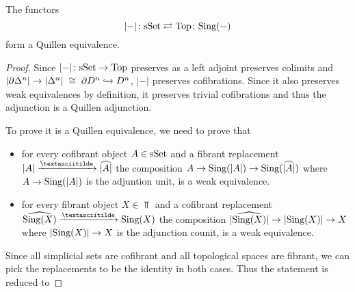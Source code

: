 \begin{prop}
    The functors
    \begin{equation*}
        \lvert-\rvert\colon\text{sSet}\rightleftarrows\text{Top}\colon\text{Sing}(-)
    \end{equation*}
    form a Quillen equivalence. 
    \begin{proof}
        Since $\lvert-\rvert\colon\text{sSet}\to\text{Top}$ preserves as a left adjoint preserves colimits and $\lvert\partial\Delta^n\rvert\to\lvert\Delta^n\rvert\;\cong\;\partial D^n\xhookrightarrow{} D^n$, $\lvert-\rvert$ preserves cofibrations.
        Since it also preserves weak equivalences by definition, it preserves trivial cofibrations and thus the adjunction is a Quillen adjunction.

        To prove it is a Quillen equivalence, we need to prove that 
        \begin{itemize}
            \item for every cofibrant object $A\in\text{sSet}$ and a fibrant replacement $\lvert A\rvert\xrightarrow{\textasciitilde}\widehat{\lvert A\rvert}$ the composition $A\to\text{Sing}(\lvert A\rvert)\to\text{Sing}(\widehat{\lvert A\rvert})$ where $A\to\text{Sing}(\lvert A\rvert)$ is the adjuntion unit, is a weak equivalence.
            \item for every fibrant object $X\in\Top$ and a cofibrant replacement $\widehat{\Sing(X)}\xrightarrow{\textasciitilde}\Sing(X)$ the composition $\lvert\widehat{\text{Sing}(X)}\rvert\to\lvert\text{Sing}(X)\rvert\to X$ where $\lvert\text{Sing}(X)\rvert\to X$ is the adjunction counit, is a weak equivalence.
        \end{itemize}
        Since all simplicial sets are cofibrant and all topological spaces are fibrant, we can pick the replacements to be the identity in both cases.
        Thus the statement is reduced to %
    \end{proof}
\end{prop}
